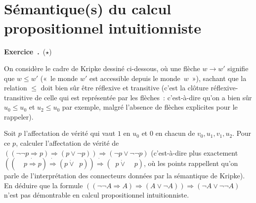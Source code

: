 \documentclass[12pt,a4paper]{article}
\theoremstyle{definition}
\newcommand\exercice{%
\refstepcounter{comcnt}\bigskip\noindent\textbf{Exercice~\thecomcnt.}}
\newcommand{\dottedlimp}{\mathbin{\dot\Rightarrow}}
\newcommand{\dottedlor}{\mathbin{\dot\lor}}
\newcommand{\dottedneg}{\mathop{\dot\neg}}
\begin{document}
%
%
%

\section{Sémantique(s) du calcul propositionnel intuitionniste}


\exercice\ (${\star}$)\par\nobreak

On considère le cadre de Kripke dessiné ci-dessous, où une flèche $w
\to w'$ signifie que $w \leq w'$ (« le monde $w'$ est accessible
depuis le monde $w$ »), sachant que la relation $\leq$ doit bien sûr
être réflexive et transitive (c'est la clôture réflexive-transitive de
celle qui est représentée par les flèches : c'est-à-dire qu'on a bien
sûr $u_0\leq u_0$ et $u_2\leq u_0$ par exemple, malgré l'absence de
flèches explicites pour le rappeler).
\begin{center}
\end{center}
Soit $p$ l'affectation de vérité qui vaut $1$ en $u_0$ et $0$ en
chacun de $v_0,u_1,v_1,u_2$.  Pour ce $p$, calculer l'affectation de
vérité de $((\neg\neg p \Rightarrow p)\Rightarrow(p\lor\neg p))
\Rightarrow(\neg p\lor\neg\neg p)$ (c'est-à-dire plus exactement
$((\dottedneg\dottedneg p \dottedlimp
p)\dottedlimp(p\dottedlor\dottedneg p)) \dottedlimp(\dottedneg
p\dottedlor\dottedneg\dottedneg p)$, où les points rappellent qu'on
parle de l'interprétation des connecteurs données par la sémantique de
Kripke).  En déduire que la formule $((\neg\neg A \Rightarrow
A)\Rightarrow(A\lor\neg A)) \Rightarrow(\neg A\lor\neg\neg A)$ n'est
pas démontrable en calcul propositionnel intuitionniste.
\end{document}
